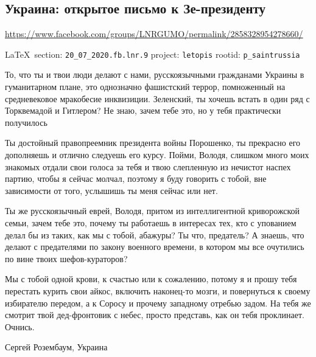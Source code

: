 
 
\subsection{Украина: открытое письмо к Зе-президенту}
\label{sec:20_07_2020.fb.lnr.9}
\url{https://www.facebook.com/groups/LNRGUMO/permalink/2858328954278660/}
  
\vspace{0.5cm}
{\small\LaTeX~section: \verb|20_07_2020.fb.lnr.9| project: \verb|letopis| rootid: \verb|p_saintrussia|}
\vspace{0.5cm}


То, что ты и твои люди делают с нами, русскоязычными гражданами Украины в
гуманитарном плане, это однозначно фашистский террор, помноженный на
средневековое мракобесие инквизиции. Зеленский, ты хочешь встать в один ряд с
Торквемадой и Гитлером? Не знаю, зачем тебе это, но у тебя практически
получилось

Ты достойный правопреемник президента войны Порошенко, ты прекрасно его
дополняешь и отлично следуешь его курсу. Пойми, Володя, слишком много моих
знакомых отдали свои голоса за тебя и твою слепленную из нечистот наспех
партию, чтобы я сейчас молчал, поэтому я буду говорить с тобой, вне зависимости
от того, услышишь ты меня сейчас или нет.

Ты же русскоязычный еврей, Володя, притом из интеллигентной криворожской семьи,
зачем тебе это, почему ты работаешь в интересах тех, кто с упованием делал бы
из таких, как мы с тобой, абажуры? Ты что, предатель? А знаешь, что делают с
предателями по закону военного времени, в котором мы все очутились по вине
твоих шефов-кураторов?

Мы с тобой одной крови, к счастью или к сожалению, потому я и прошу тебя
перестать курить свои айкос, включить наконец-то мозги, и повернуться к своему
избирателю передом, а к Соросу и прочему западному отребью задом. На тебя же
смотрит твой дед-фронтовик с небес, просто представь, как он тебя проклинает.
Очнись.

Сергей Розембаум, Украина
  

